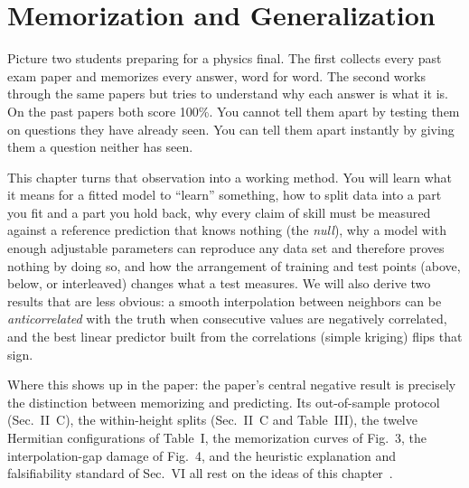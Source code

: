 \chapter{Memorization and Generalization}\label{ch:generalization}

\begin{chapterintro}
Picture two students preparing for a physics final. The first collects every past exam paper and memorizes every answer, word for word. The second works through the same papers but tries to understand why each answer is what it is. On the past papers both score 100\%. You cannot tell them apart by testing them on questions they have already seen. You can tell them apart instantly by giving them a question neither has seen.

This chapter turns that observation into a working method. You will learn what it means for a fitted model to ``learn'' something, how to split data into a part you fit and a part you hold back, why every claim of skill must be measured against a reference prediction that knows nothing (the \emph{null}), why a model with enough adjustable parameters can reproduce any data set and therefore proves nothing by doing so, and how the arrangement of training and test points (above, below, or interleaved) changes what a test measures. We will also derive two results that are less obvious: a smooth interpolation between neighbors can be \emph{anticorrelated} with the truth when consecutive values are negatively correlated, and the best linear predictor built from the correlations (simple kriging) flips that sign.

Where this shows up in the paper: the paper's central negative result is precisely the distinction between memorizing and predicting. Its out-of-sample protocol (Sec.~II~C), the within-height splits (Sec.~II~C and Table~III), the twelve Hermitian configurations of Table~I, the memorization curves of Fig.~3, the interpolation-gap damage of Fig.~4, and the heuristic explanation and falsifiability standard of Sec.~VI all rest on the ideas of this chapter~\cite{soniR1}.
\end{chapterintro}

